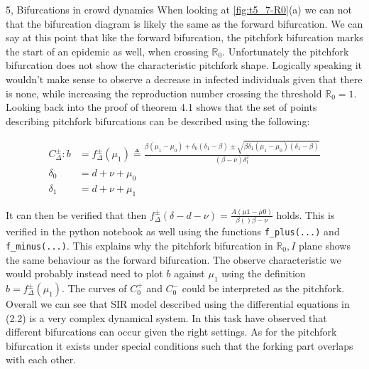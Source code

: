 \begin{task}{5, Bifurcations in crowd dynamics}
When looking at \ref{fig:t5_7-R0}(a) we can not that the bifurcation diagram is likely the same as the forward bifurcation. We can say at this point that like the forward bifurcation, the pitchfork bifurcation marks the start of an epidemic as well, when crossing $\mathbb{R}_0$. Unfortunately the pitchfork bifurcation does not show the characteristic pitchfork shape. Logically speaking it wouldn't make sense to observe a decrease in infected individuals given that there is none, while increasing the reproduction number crossing the threshold $\mathbb{R}_0 = 1$. Looking back into \cite{shan2014bifurcations} the proof of theorem 4.1 shows that the set of points describing pitchfork bifurcations can be described using the following:

\begin{align*}
    C^\pm_{\Delta}: b&=f^\pm_{\Delta}(\mu_1)\triangleq\frac{\beta (\mu_1-\mu_0)+\delta_0(\delta_1-\beta)\pm \sqrt{\beta\delta_1(\mu_1-\mu_0)(\delta_1-\beta)}}{(\beta-\nu)\delta_1^2}\\
    \delta_0 &= d+\nu+\mu_0\\
    \delta_1 &= d+\nu+\mu_1
\end{align*}

It can then be verified that then $f^\pm_{\Delta}(\delta-d-\nu)=\frac{A(\mu1-\mu0)}{\beta()\beta-\nu}$ holds. This is verified in the python notebook as well using the functions \verb|f_plus(...)| and \verb|f_minus(...)|. This explains why the pitchfork bifurcation in $\mathbb{R}_0,I$ plane shows the same behaviour as the forward bifurcation. The observe characteristic we would probably instead need to plot $b$ against $\mu_1$ using the definition $b=f^\pm_{\Delta}(\mu_1)$. The curves of $C_0^+$ and $C^-_0$ could be interpreted as the pitchfork.\\

Overall we can see that SIR model described using the differential equations in \cite{shan2014bifurcations}(2.2) is a very complex dynamical system. In this task have observed that different bifurcations can occur given the right settings. As for the pitchfork bifurcation it exists under special conditions such that the forking part overlaps with each other.


\end{task}
